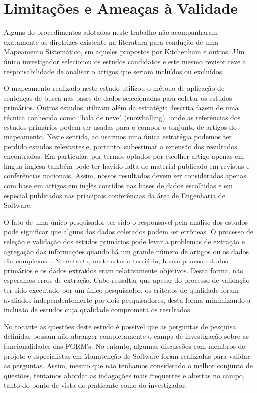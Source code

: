\section{Limitações e Ameaças à Validade} \label{sec:limitacoes_ameacas}

Alguns do procedimentos adotados neste trabalho não acompanharam exatamente as
diretrizes existente na literatura para condução de uma Mapeamento Sistemático,
em aqueles propostos por Kitchenham e outros~\cite{keele2007guidelines}.Um único
investigador selecionou os estudos candidatos e este mesmo revisor teve a
responsabilidade de analisar o artigos que seriam incluídos ou excluídos.

O mapeamento realizado neste estudo utilizou o método de aplicação de sentenças
de busca nas bases de dados selecionadas para coletar os estudos primários.
Outros estudos utilizam além da estratégia descrita fazem de uma técnica
conhecida  como ``bola de neve" (snowballing)~\cite{wohlin2014guidelines} onde
as referências dos estudos primários podem ser usadas para o compor o conjunto
de artigos do mapeamento. Neste sentido, ao usarmos uma única estratégia podemos
ter perdido estudos relevantes e, portanto, subestimar a extensão dos resultados
encontrados. Em particular, por termos optados por escolher artigo apenas em
língua inglesa também pode ter havido falta de material publicado em revistas e
conferências nacionais.  Assim, nossos resultados devem ser considerados apenas
com base em artigos em inglês contidos nas bases de dados escolhidas  e em
especial publicados nas principais conferências da área de Engenharia de
Software.

O fato de uma único pesquisador ter sido o responsável pela análise dos estudos
pode significar que alguns dos dados coletados podem ser errôneas. O processo de
seleção e validação dos estudos primários pode levar a problemas de extração e
agregação das informações quando há um grande número de artigos ou os dados são
complexos~\cite{keele2007guidelines}. No entanto, neste estudo terciário, houve
poucos estudos primários e os dados extraídos eram relativamente objetivos.
Desta forma, não esperamos erros de extração. Cabe ressaltar que apesar do
processo de validação ter sido executado por um único pesquisador, os critérios
de qualidade foram avaliados independentemente por dois pesquisadores, desta
forma minimizando a inclusão de estudos cuja qualidade comprometa os resultados.

No tocante as questões deste estudo  é  possível que as perguntas de pesquisa
definidas possam não abranger completamente o campo de investigação sobre as
funcionalidades das FGRM's. No entanto, algumas discussões com membros do
projeto e especialistas em Manutenção de Software foram realizadas para validar
as perguntas. Assim, mesmo que não tenhamos considerado o melhor conjunto de
questões, tentamos abordar as indagações mais frequentes e abertas no campo,
tanto do ponto de vista do praticante como do investigador.

